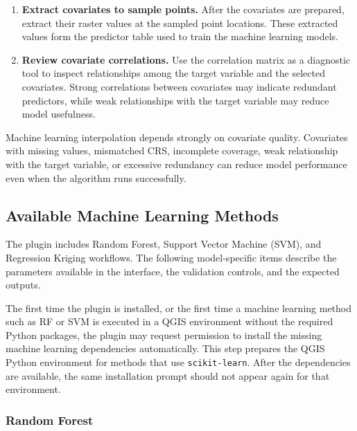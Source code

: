 \documentclass[11pt,a4paper]{article}
\begin{document}
\begin{enumerate}
    \item \textbf{Extract covariates to sample points.} After the covariates are prepared, extract their raster values at the sampled point locations. These extracted values form the predictor table used to train the machine learning models.


    \item \textbf{Review covariate correlations.} Use the correlation matrix as a diagnostic tool to inspect relationships among the target variable and the selected covariates. Strong correlations between covariates may indicate redundant predictors, while weak relationships with the target variable may reduce model usefulness.
\end{enumerate}


\begin{infobox}
Machine learning interpolation depends strongly on covariate quality. Covariates with missing values, mismatched CRS, incomplete coverage, weak relationship with the target variable, or excessive redundancy can reduce model performance even when the algorithm runs successfully.
\end{infobox}


\subsection{Available Machine Learning Methods}


The plugin includes Random Forest, Support Vector Machine (SVM), and Regression Kriging workflows. The following model-specific items describe the parameters available in the interface, the validation controls, and the expected outputs.


\begin{infobox}
The first time the plugin is installed, or the first time a machine learning method such as RF or SVM is executed in a QGIS environment without the required Python packages, the plugin may request permission to install the missing machine learning dependencies automatically. This step prepares the QGIS Python environment for methods that use \texttt{scikit-learn}. After the dependencies are available, the same installation prompt should not appear again for that environment.
\end{infobox}


\subsubsection{Random Forest}
\end{document}
